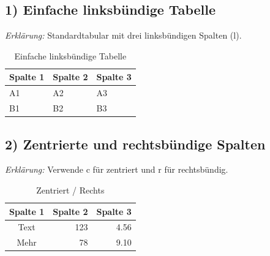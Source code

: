 \documentclass[twoside]{scrreprt}
\begin{document}
\subsection*{1) Einfache linksbündige Tabelle}
	\textit{Erklärung:} Standardtabular mit drei linksbündigen Spalten (l).	%
\begin{table}[h!]															%
	\centering								                                %
	\caption{Einfache linksbündige Tabelle}                                 %
	\begin{tabular}{lll}                                                    %
	
		Spalte 1 & Spalte 2 & Spalte 3 \\                                   %
		\midrule                                                            %
		A1 & A2 & A3 \\                                                     %
		B1 & B2 & B3 \\                                                     %
		\bottomrule                                                         %
	\end{tabular}                                                           %
\end{table}                                                                 %

\subsection*{2) Zentrierte und rechtsbündige Spalten}
	\textit{Erklärung:} Verwende c für zentriert und r für rechtsbündig.
\begin{table}[h!]
	\centering
	\caption{Zentriert / Rechts}
	\begin{tabular}{crr}
	
		Spalte 1 & Spalte 2 & Spalte 3 \\
		\midrule
		Text & 123 & 4.56 \\
		Mehr & 78 & 9.10 \\
		\bottomrule
	\end{tabular}
\end{table}
\end{document}
